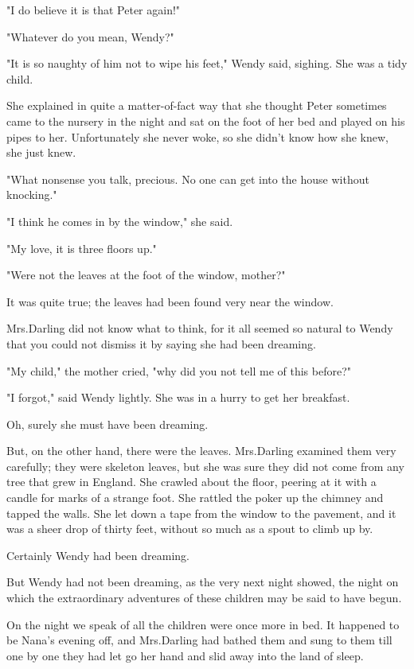 "I do believe it is that Peter again!"

"Whatever do you mean, Wendy?"

"It is so naughty of him not to wipe his feet," Wendy said, sighing.
She was a tidy child.

She explained in quite a matter-of-fact way
that she thought Peter sometimes came to the nursery in the night
and sat on the foot of her bed and played on his pipes to her.
Unfortunately she never woke, so she didn't know how she knew, she just knew.

"What nonsense you talk, precious.
No one can get into the house without knocking."

"I think he comes in by the window," she said.

"My love, it is three floors up."

"Were not the leaves at the foot of the window, mother?"

It was quite true;
the leaves had been found very near the window.

Mrs.\@ Darling did not know what to think,
for it all seemed so natural to Wendy that you could not dismiss it by saying she had been dreaming.

"My child," the mother cried, "why did you not tell me of this before?"

"I forgot," said Wendy lightly.
She was in a hurry to get her breakfast.

Oh, surely she must have been dreaming.

But, on the other hand, there were the leaves.
Mrs.\@ Darling examined them very carefully;
they were skeleton leaves, but she was sure they did not come from any tree that grew in England.
She crawled about the floor, peering at it with a candle for marks of a strange foot.
She rattled the poker up the chimney and tapped the walls.
She let down a tape from the window to the pavement,
and it was a sheer drop of thirty feet, without so much as a spout to climb up by.

Certainly Wendy had been dreaming.

But Wendy had not been dreaming,
as the very next night showed,
the night on which the extraordinary adventures of these children may be said to have begun.

On the night we speak of all the children were once more in bed.
It happened to be Nana's evening off,
and Mrs.\@ Darling had bathed them and sung to them till
one by one they had let go her hand and slid away into the land of sleep.

